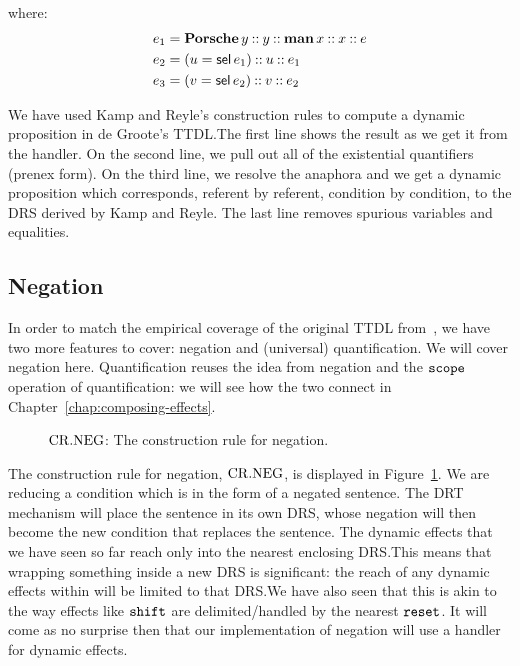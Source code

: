 where:
\vspace{-1mm}
\begin{align*}
  e_1 &= \textbf{Porsche}\,y \mathbin{::} y \mathbin{::} \textbf{man}\,x \mathbin{::} x \mathbin{::} e \\
  e_2 &= (u = \textsf{sel}\,e_1) \mathbin{::} u \mathbin{::} e_1 \\
  e_3 &= (v = \textsf{sel}\,e_2) \mathbin{::} v \mathbin{::} e_2
\end{align*}

We have used Kamp and Reyle's construction rules to compute a dynamic
proposition in de Groote's TTDL.\@ The first line shows the result as we
get it from the handler. On the second line, we pull out all of the
existential quantifiers (prenex form). On the third line, we resolve the
anaphora and we get a dynamic proposition which corresponds, referent by
referent, condition by condition, to the DRS derived by Kamp and Reyle. The
last line removes spurious variables and equalities.


\subsection{Negation}
\label{ssec:dynamic-negation}

In order to match the empirical coverage of the original TTDL
from~\cite{de2006towards}, we have two more features to cover: negation and
(universal) quantification. We will cover negation here. Quantification
reuses the idea from negation and the $\mathtt{scope}$ operation of
quantification: we will see how the two connect in
Chapter~\ref{chap:composing-effects}.

\begin{figure}
  \centering
  \crnegbox
  \caption{\label{fig:crneg} $\mathrm{CR.NEG}$: The construction rule for negation.}
\end{figure}

The construction rule for negation, $\mathrm{CR.NEG}$, is displayed in
Figure~\ref{fig:crneg}. We are reducing a condition which is in the form of
a negated sentence. The DRT mechanism will place the sentence in its own
DRS, whose negation will then become the new condition that replaces the
sentence. The dynamic effects that we have seen so far reach only into the
nearest enclosing DRS.\@ This means that wrapping something inside a new
DRS is significant: the reach of any dynamic effects within will be limited
to that DRS.\@ We have also seen that this is akin to the way effects like
$\mathtt{shift}$ are delimited/handled by the nearest $\mathtt{reset}$. It will come as no
surprise then that our implementation of negation will use a handler for
dynamic effects.

